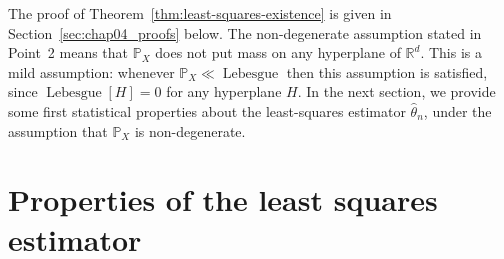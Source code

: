 \documentclass[
	fontsize=11pt, %
	twoside=false, %
	numbers=noenddot, %
]{kaobook}
\DeclareMathOperator{\leb}{Lebesgue}
\renewcommand{\P}{\mathbb P}
\newcommand{\R}{\mathbb R}
\newcommand{\wh}{\widehat}
\begin{document}
The proof of Theorem~\ref{thm:least-squares-existence} is given in Section~\ref{sec:chap04_proofs} below.
The non-degenerate assumption stated in Point~2 means that $\P_X$ does not put mass on any hyperplane of $\R^d$.
This is a mild assumption: whenever $\P_X \ll \leb$ then this assumption is satisfied, since $\leb[H] = 0$ for any hyperplane $H$.
In the next section, we provide some first statistical properties about the least-squares estimator $\wh \theta_n$, under the assumption that $\P_X$ is non-degenerate.

\section{Properties of the least squares estimator} %
\label{sec:some_properties_of_the_least_squares_estimator}
\end{document}
